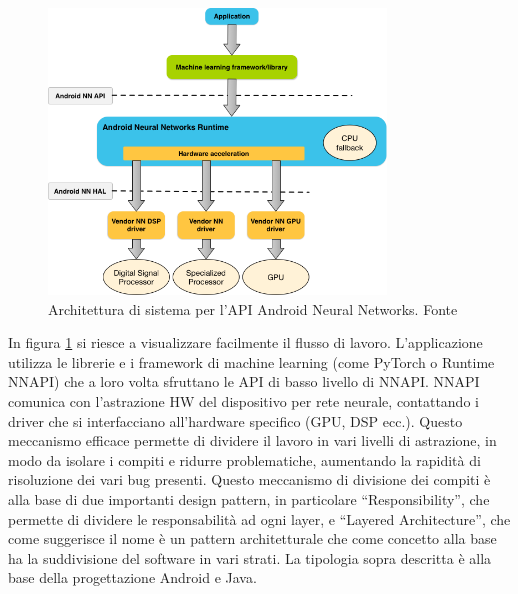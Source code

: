 \begin{figure}
    \centering
    \includegraphics[width=0.8\textwidth]{Immagini/nnapi_architecture.png}
    \caption{Architettura di sistema per l'API Android Neural Networks. Fonte \cite{NNAPI}}
    \label{fig:nnapiArchitecture}
\end{figure}

In figura \ref{fig:nnapiArchitecture} si riesce a visualizzare facilmente il flusso di lavoro. L’applicazione utilizza le librerie e i framework di machine
learning (come PyTorch o Runtime NNAPI) che a loro volta sfruttano le API di basso livello di NNAPI.
NNAPI comunica con l’astrazione HW del dispositivo per rete neurale, contattando i driver che si interfacciano all’hardware specifico (GPU, DSP ecc.).
Questo meccanismo efficace permette di dividere il lavoro in vari livelli di astrazione, in modo da isolare i compiti e ridurre problematiche, aumentando
la rapidità di risoluzione dei vari bug presenti. Questo meccanismo di divisione dei compiti è alla base di due importanti design pattern, in particolare
“Responsibility”, che permette di dividere le responsabilità ad ogni layer, e “Layered Architecture”, che come suggerisce il nome è un pattern architetturale
che come concetto alla base ha la suddivisione del software in vari strati. La tipologia sopra descritta è alla base della progettazione Android e Java.


